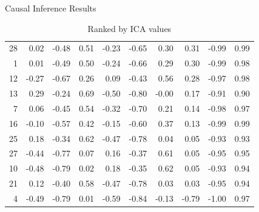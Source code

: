 \documentclass[a4paper,9pt]{beamer}\usepackage[]{graphicx}\usepackage[]{color}
\begin{document}
\begin{frame}{Causal Inference Results}
\begin{table}[ht]
\begin{tabular}{rrrrrrrrrr}
   28 & 0.02 & -0.48 & 0.51 & -0.23 & -0.65 & 0.30 & 0.31 & -0.99 & 0.99 \\ 
    1 & 0.01 & -0.49 & 0.50 & -0.24 & -0.66 & 0.29 & 0.30 & -0.99 & 0.98 \\ 
   12 & -0.27 & -0.67 & 0.26 & 0.09 & -0.43 & 0.56 & 0.28 & -0.97 & 0.98 \\ 
   13 & 0.29 & -0.24 & 0.69 & -0.50 & -0.80 & -0.00 & 0.17 & -0.91 & 0.90 \\ 
    7 & 0.06 & -0.45 & 0.54 & -0.32 & -0.70 & 0.21 & 0.14 & -0.98 & 0.97 \\ 
   16 & -0.10 & -0.57 & 0.42 & -0.15 & -0.60 & 0.37 & 0.13 & -0.99 & 0.99 \\ 
   25 & 0.18 & -0.34 & 0.62 & -0.47 & -0.78 & 0.04 & 0.05 & -0.93 & 0.93 \\ 
   27 & -0.44 & -0.77 & 0.07 & 0.16 & -0.37 & 0.61 & 0.05 & -0.95 & 0.95 \\ 
   10 & -0.48 & -0.79 & 0.02 & 0.18 & -0.35 & 0.62 & 0.05 & -0.93 & 0.94 \\ 
   21 & 0.12 & -0.40 & 0.58 & -0.47 & -0.78 & 0.03 & 0.03 & -0.95 & 0.94 \\ 
    4 & -0.49 & -0.79 & 0.01 & -0.59 & -0.84 & -0.13 & -0.79 & -1.00 & 0.97 \\ 
   \hline
\end{tabular}
\caption{Ranked by ICA values}
\end{table}

\end{frame}
\end{document}
